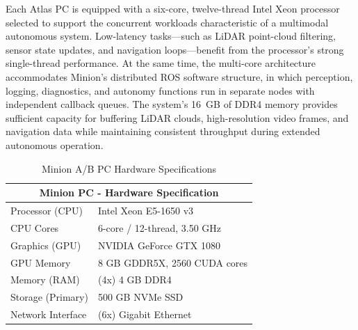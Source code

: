 \documentclass{erauthesis}
\begin{document}
Each Atlas PC is equipped with a six-core, twelve-thread Intel Xeon processor selected to support the concurrent workloads characteristic of a multimodal autonomous system. Low-latency tasks—such as LiDAR point-cloud filtering, sensor state updates, and navigation loops—benefit from the processor’s strong single-thread performance. At the same time, the multi-core architecture accommodates Minion’s distributed ROS software structure, in which perception, logging, diagnostics, and autonomy functions run in separate nodes with independent callback queues. The system’s 16~GB of DDR4 memory provides sufficient capacity for buffering LiDAR clouds, high-resolution video frames, and navigation data while maintaining consistent throughput during extended autonomous operation.

\begin{table}[htpb]
\centering
\begin{tabular}{ll}
\hline
\multicolumn{2}{c}{Minion PC - Hardware Specification} \\
\hline
\hline
Processor (CPU) & Intel Xeon E5-1650 v3 \\
CPU Cores & 6-core / 12-thread, 3.50 GHz \\
Graphics (GPU) & NVIDIA GeForce GTX 1080 \\
GPU Memory & 8 GB GDDR5X, 2560 CUDA cores \\
Memory (RAM) & (4x) 4 GB DDR4 \\
Storage (Primary) & 500 GB NVMe SSD \\
Network Interface & (6x) Gigabit Ethernet \\%
\hline
\end{tabular}
\caption{Minion A/B PC Hardware Specifications}
\label{table:Minion_hardware}
\end{table}
\end{document}
